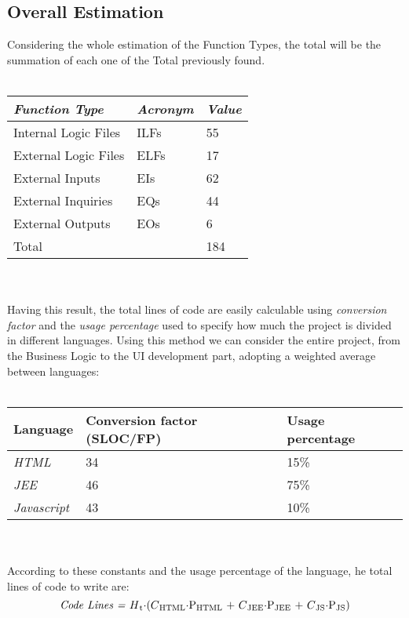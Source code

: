 \documentclass[11pt,a4paper]{report}
\begin{document}
\subsection{Overall Estimation}
Considering the whole estimation of the Function Types, the total will be the summation of each one of the Total previously found. 
\\\\
\begin{tabularx}{\textwidth}{|X|X|X|}
	\hline
	\textit{Function Type} & \textit{Acronym} & \textit{Value}\\
	\hline
	Internal Logic Files & ILFs & 55\\
	\hline
	External Logic Files & ELFs & 17\\
	\hline
	External Inputs & EIs & 62\\
	\hline
	External Inquiries & EQs & 44\\
	\hline
	External Outputs & EOs & 6\\
	\hline
	\hline
	Total & \multicolumn{1}{X}{} & \multicolumn{1}{X|}{184}\\
	\hline
\end{tabularx}
\\\\
Having this result, the total lines of code are easily calculable using   \textit{conversion factor} and the \textit{usage percentage} used to specify how much the project is divided in different languages. Using this method we can consider the entire project, from the Business Logic to the UI development part, adopting a weighted average between languages:
\\\\
\begin{tabularx}{\textwidth}{|X|X|X|}
	\hline
	\textbf{Language} & \textbf{Conversion factor (SLOC/FP)} & \textbf{Usage percentage}\\
	\hline
	\textit{HTML} & 34 & 15\%\\
	\hline
	\textit{JEE} & 46 & 75\%\\
	\hline
	\textit{Javascript} & 43 & 10\%\\
	\hline
\end{tabularx}
\\\\
According to these constants and the usage percentage of the language, he total lines of code to write are:\\
\begin{equation}
	\centerline{\textit{Code Lines =} $H\textsubscript{t}\cdot$($C\textsubscript{HTML}\cdot$P\textsubscript{HTML} + $C\textsubscript{JEE}\cdot$P\textsubscript{JEE} + $C\textsubscript{JS}\cdot$P\textsubscript{JS})}
\end{equation}
\end{document}
